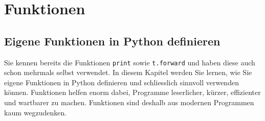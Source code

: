 \chapter{Funktionen}\label{ch:K04_Functions}

\section{Eigene Funktionen in Python definieren}

Sie kennen bereits die Funktionen \lstinline|print| sowie \lstinline|t.forward| und haben diese auch schon mehrmals selbst verwendet. In diesem Kapitel werden Sie lernen, wie Sie eigene Funktionen in Python definieren und schliesslich sinnvoll verwenden können. Funktionen helfen enorm dabei, Programme leserlicher, kürzer, effizienter und wartbarer zu machen. Funktionen sind deshalb aus modernen Programmen kaum wegzudenken.

